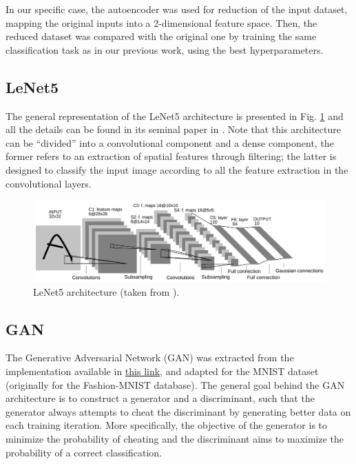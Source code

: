 \documentclass[conference]{IEEEtran}
\theoremstyle{definition}
\theoremstyle{remark}
\theoremstyle{remark}
\begin{document}
In our specific case, the autoencoder was used for reduction of the input
dataset, mapping the original inputs into a 2-dimensional feature space. Then,
the reduced dataset was compared with the original one by training the same
classification task as in our previous work, using the best hyperparameters.

\subsection{LeNet5}
The general representation of the LeNet5 architecture is presented in Fig.
\ref{fig:lenet5} and all the details can be found in its seminal paper in
\parencite{lecun1998gradient}. Note that this architecture can be ``divided''
into a convolutional component and a dense component, the former refers to an
extraction of spatial features through filtering; the latter is designed to
classify the input image according to all the feature extraction in the
convolutional layers.

\begin{figure}
  \centering \includegraphics[width=\textwidth]{figs/letnet5.png}
  \caption{LeNet5 architecture (taken from \parencite{lecun1998gradient}).}
  \label{fig:lenet5}
\end{figure}

\subsection{GAN}
The Generative Adversarial Network (GAN) was extracted from the implementation
available in \href{https://bit.ly/39Wwirg}{this link}, and adapted for the MNIST
dataset (originally for the Fashion-MNIST database). The general goal behind the
GAN architecture is to construct a generator and a discriminant, such that the
generator always attempts to cheat the discriminant by generating better data on
each training iteration. More specifically, the objective of the generator is to
minimize the probability of cheating and the discriminant aims to maximize the
probability of a correct classification.
\end{document}
